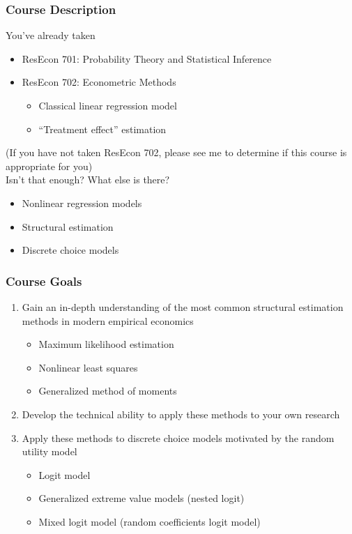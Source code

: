 \documentclass{beamer}\usepackage[]{graphicx}\usepackage[]{color}
\begin{document}
\begin{frame}\frametitle{Course Description}
    You've already taken
    \begin{itemize}
        \item ResEcon 701: Probability Theory and Statistical Inference
        \item ResEcon 702: Econometric Methods
        \begin{itemize}
            \item Classical linear regression model
            \item ``Treatment effect'' estimation
        \end{itemize}
    \end{itemize}
    (If you have not taken ResEcon 702, please see me to determine if this course is appropriate for you) \\
    \vspace{3ex}
    Isn't that enough? What else is there?
    \begin{itemize}
        \item Nonlinear regression models 
        \item Structural estimation
        \item Discrete choice models
    \end{itemize}
\end{frame}

\begin{frame}\frametitle{Course Goals}
    \begin{enumerate}
        \item Gain an in-depth understanding of the most common structural estimation methods in modern empirical economics
        \begin{itemize}
            \item Maximum likelihood estimation
            \item Nonlinear least squares
            \item Generalized method of moments
        \end{itemize}
        \vspace{1ex} 
        \item Develop the technical ability to apply these methods to your own research
        \vspace{1ex}
        \item Apply these methods to discrete choice models motivated by the random utility model
        \begin{itemize}
            \item Logit model
            \item Generalized extreme value models (nested logit)
            \item Mixed logit model (random coefficients logit model)
        \end{itemize}
    \end{enumerate}
\end{frame}
\end{document}

